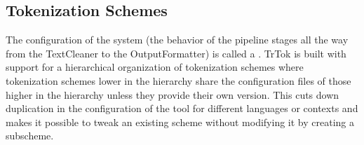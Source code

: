 \subsection{Tokenization Schemes}

The configuration of the system (the behavior of the pipeline stages
all the way from the TextCleaner to the OutputFormatter) is called a
. TrTok is built with support for a
hierarchical organization of tokenization schemes where tokenization
schemes lower in the hierarchy share the configuration files of those
higher in the hierarchy unless they provide their own version. This
cuts down duplication in the configuration of the tool for different
languages or contexts and makes it possible to tweak an existing
scheme without modifying it by creating a subscheme.
